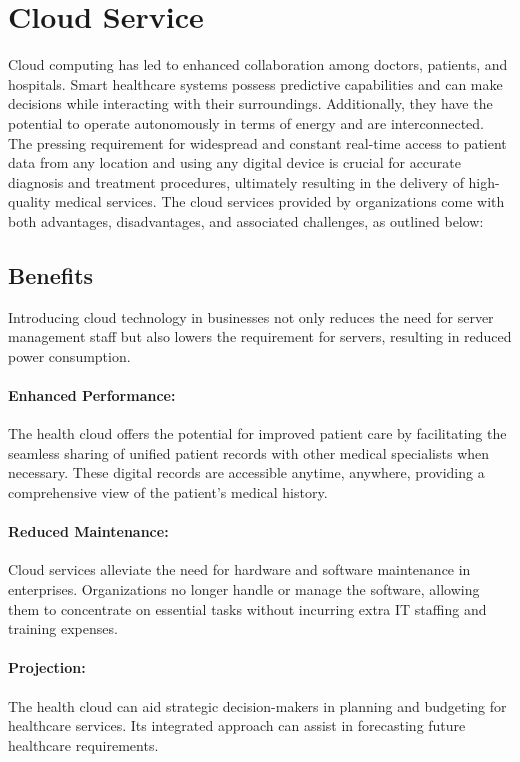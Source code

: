 \documentclass{article}
\begin{document}
\section{Cloud Service} 
Cloud computing has led to enhanced collaboration among doctors, patients, and hospitals. Smart healthcare systems possess predictive capabilities and can make decisions while interacting with their surroundings. Additionally, they have the potential to operate autonomously in terms of energy and are interconnected. The pressing requirement for widespread and constant real-time access to patient data from any location and using any digital device is crucial for accurate diagnosis and treatment procedures, ultimately resulting in the delivery of high-quality medical services. The cloud services provided by organizations come with both advantages, disadvantages, and associated challenges, as outlined below:
\subsection{Benefits} Introducing cloud technology in businesses not only reduces the need for server management staff but also lowers the requirement for servers, resulting in reduced power consumption.
\paragraph{Enhanced Performance:} The health cloud offers the potential for improved patient care by facilitating the seamless sharing of unified patient records with other medical specialists when necessary. These digital records are accessible anytime, anywhere, providing a comprehensive view of the patient's medical history.

\paragraph{Reduced Maintenance:} Cloud services alleviate the need for hardware and software maintenance in enterprises. Organizations no longer handle or manage the software, allowing them to concentrate on essential tasks without incurring extra IT staffing and training expenses.

\paragraph{Projection:} The health cloud can aid strategic decision-makers in planning and budgeting for healthcare services. Its integrated approach can assist in forecasting future healthcare requirements.
\end{document}
